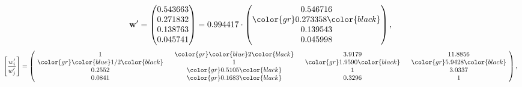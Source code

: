 \begin{example}
\begin{equation*}
\mathbf{w}^{\prime} =
\begin{pmatrix}
0.543663\\
0.271832\\
0.138763\\
0.045741
\end{pmatrix} =
0.994417\cdot
\begin{pmatrix}
0.546716\\
\color{gr} 0.273358\color{black} \\
0.139543\\
0.045998
\end{pmatrix},
\end{equation*}
\begin{equation*}
\left[ \frac{{w}^{\prime}_i}{{w}^{\prime}_j} \right] =
\begin{pmatrix}
$\,\,$ 1 $\,\,$ & $\,\,$\color{gr} \color{blue} 2\color{black} $\,\,$ & $\,\,$3.9179$\,\,$ & $\,\,$11.8856$\,\,$ \\
$\,\,$\color{gr} \color{blue}  1/2\color{black} $\,\,$ & $\,\,$ 1 $\,\,$ & $\,\,$\color{gr} 1.9590\color{black} $\,\,$ & $\,\,$\color{gr} 5.9428\color{black}   $\,\,$ \\
$\,\,$0.2552$\,\,$ & $\,\,$\color{gr} 0.5105\color{black} $\,\,$ & $\,\,$ 1 $\,\,$ & $\,\,$3.0337 $\,\,$ \\
$\,\,$0.0841$\,\,$ & $\,\,$\color{gr} 0.1683\color{black} $\,\,$ & $\,\,$0.3296$\,\,$ & $\,\,$ 1  $\,\,$ \\
\end{pmatrix},
\end{equation*}
\end{example}
\newpage
